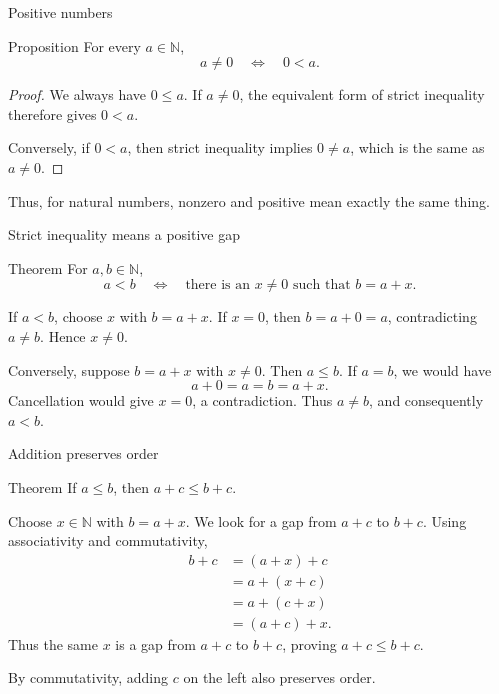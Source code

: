 \documentclass[aspectratio=169,11pt]{beamer}
\newcommand{\N}{\mathbb N}
\begin{document}
\begin{frame}{Positive numbers}
  \begin{block}{Proposition}
    For every \(a\in\N\),
    \[
      a\ne0\quad\Longleftrightarrow\quad 0<a.
    \]
  \end{block}

  \begin{proof}
    We always have \(0\le a\).  If \(a\ne0\), the equivalent form of strict
    inequality therefore gives \(0<a\).

    Conversely, if \(0<a\), then strict inequality implies \(0\ne a\), which
    is the same as \(a\ne0\).
  \end{proof}

  Thus, for natural numbers, \alert{nonzero} and \alert{positive} mean exactly
  the same thing.
\end{frame}

\begin{frame}{Strict inequality means a positive gap}
  \begin{block}{Theorem}
    For \(a,b\in\N\),
    \[
      a<b
      \quad\Longleftrightarrow\quad
      \text{there is an }x\ne0\text{ such that }b=a+x.
    \]
  \end{block}

  If \(a<b\), choose \(x\) with \(b=a+x\).  If \(x=0\), then
  \(b=a+0=a\), contradicting \(a\ne b\).  Hence \(x\ne0\).

  Conversely, suppose \(b=a+x\) with \(x\ne0\).  Then \(a\le b\).  If \(a=b\),
  we would have
  \[
    a+0=a=b=a+x.
  \]
  Cancellation would give \(x=0\), a contradiction.  Thus \(a\ne b\), and
  consequently \(a<b\).
\end{frame}

\begin{frame}{Addition preserves order}
  \begin{block}{Theorem}
    If \(a\le b\), then \(a+c\le b+c\).
  \end{block}

  Choose \(x\in\N\) with \(b=a+x\).  We look for a gap from \(a+c\) to \(b+c\).
  Using associativity and commutativity,
  \begin{align*}
    b+c
      &=(a+x)+c\\
      &=a+(x+c)\\
      &=a+(c+x)\\
      &=(a+c)+x.
  \end{align*}
  Thus the same \(x\) is a gap from \(a+c\) to \(b+c\), proving
  \(a+c\le b+c\).

  By commutativity, adding \(c\) on the left also preserves order.
\end{frame}
\end{document}
